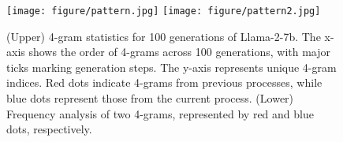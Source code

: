 \begin{figure}[t!]
\centering
\texttt{[image: figure/pattern.jpg]}
\texttt{[image: figure/pattern2.jpg]}
\vspace{-.8em}
\caption{\small (Upper) 4-gram statistics for 100 generations of Llama-2-7b. The x-axis shows the order of 4-grams across 100 generations, with major ticks marking generation steps. The y-axis represents unique 4-gram indices. Red dots indicate 4-grams from previous processes, while blue dots represent those from the current process. (Lower) Frequency analysis of two 4-grams, represented by red and blue dots, respectively.}
\label{fig:generation}
\vspace{-1.5em}
\end{figure}